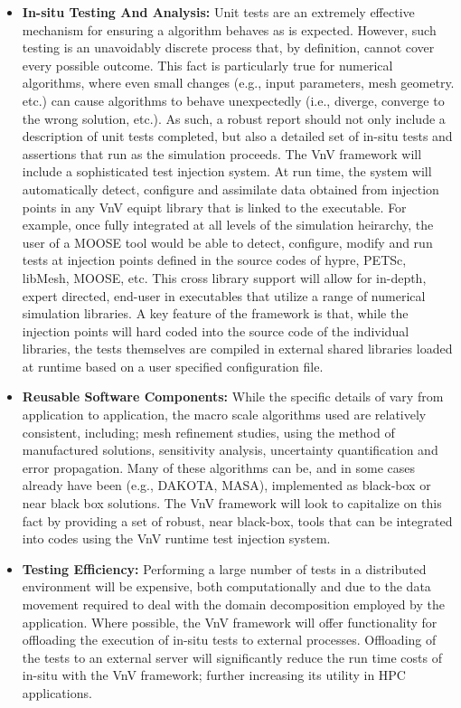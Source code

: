 \begin{itemize}
 
 \item{ \bf In-situ Testing And Analysis:} Unit tests are an extremely effective mechanism for ensuring a algorithm behaves as is expected. However, such testing is an unavoidably discrete process that, by definition, cannot cover every possible outcome. This fact is particularly true for numerical algorithms, where even small changes (e.g., input parameters, mesh geometry. etc.) can cause algorithms to behave unexpectedly (i.e., diverge, converge to the wrong solution, etc.). As such, a robust \VV report should not only include a description of unit tests completed, but also a detailed set of in-situ tests and assertions that run as the simulation proceeds. The VnV framework will include a sophisticated test injection system. At run time, the system will automatically detect, configure and assimilate data obtained from injection points in any VnV equipt library that is linked to the executable. For example, once fully integrated at all levels of the simulation heirarchy, the user of a MOOSE tool would be able to detect, configure, modify and run tests at injection points defined in the source codes of hypre, PETSc, libMesh, MOOSE, etc. This cross library support will allow for in-depth, expert directed, end-user \VV in executables that utilize a range of numerical simulation libraries. A key feature of the framework is that, while the injection points will hard coded into the source code of the individual libraries, the tests themselves are compiled in external shared libraries loaded at runtime based on a user specified configuration file. 
 
 \item {\bf Reusable Software Components:} While the specific details of \VV vary from application to application, the macro scale algorithms used are relatively consistent, including; mesh refinement studies, using the method of manufactured solutions, sensitivity analysis, uncertainty quantification and error propagation. Many of these algorithms can be, and in some cases already have been (e.g., DAKOTA, MASA),  implemented as black-box or near black box solutions. The VnV framework will look to capitalize on this fact by providing a set of robust, near black-box, \VV tools that can be integrated into codes using the VnV runtime test injection system. 
  
 \item{\bf \VV Testing Efficiency:}  Performing a large number of \VV tests in a distributed environment will be expensive, both computationally and due to the data movement required to deal with the domain decomposition employed by the application. Where possible, the VnV framework will offer functionality for offloading the execution of in-situ tests to external processes. Offloading of the tests to an external server will significantly reduce the run time costs of in-situ \VV with the VnV framework; further increasing its utility in HPC applications. 
 

\end{itemize}

